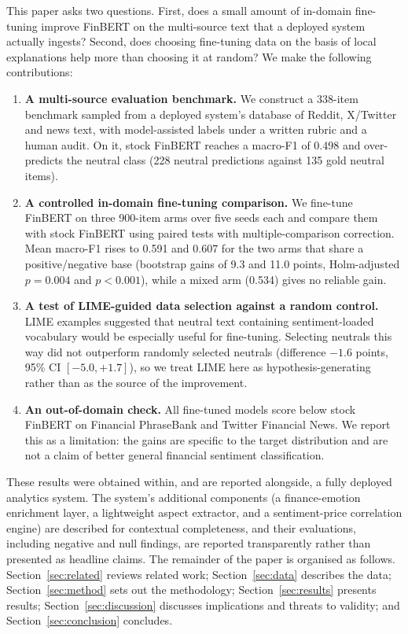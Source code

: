 \documentclass{aims}
\numberwithin{equation}{section}
\begin{document}
This paper asks two questions. First, does a small amount of in-domain fine-tuning
improve FinBERT on the multi-source text that a deployed system actually ingests?
Second, does choosing fine-tuning data on the basis of local explanations help more
than choosing it at random? We make the following contributions:
\begin{enumerate}
\item \textbf{A multi-source evaluation benchmark.} We construct a 338-item benchmark
sampled from a deployed system's database of Reddit, X/Twitter and news text, with
model-assisted labels under a written rubric and a human audit. On it, stock FinBERT
reaches a macro-F1 of 0.498 and over-predicts the neutral class (228 neutral
predictions against 135 gold neutral items).
\item \textbf{A controlled in-domain fine-tuning comparison.} We fine-tune FinBERT on
three 900-item arms over five seeds each and compare them with stock FinBERT using
paired tests with multiple-comparison correction. Mean macro-F1 rises to 0.591 and
0.607 for the two arms that share a positive/negative base (bootstrap gains of 9.3
and 11.0 points, Holm-adjusted $p = 0.004$ and $p < 0.001$), while a mixed arm
(0.534) gives no reliable gain.
\item \textbf{A test of LIME-guided data selection against a random control.}
LIME examples suggested that neutral text containing sentiment-loaded vocabulary
would be especially useful for fine-tuning. Selecting neutrals this way did not
outperform randomly selected neutrals (difference $-1.6$ points, 95\% CI
$[-5.0, +1.7]$), so we treat LIME here as hypothesis-generating rather than as the
source of the improvement.
\item \textbf{An out-of-domain check.} All fine-tuned models score below stock
FinBERT on Financial PhraseBank and Twitter Financial News. We report this as a
limitation: the gains are specific to the target distribution and are not a claim
of better general financial sentiment classification.
\end{enumerate}

These results were obtained within, and are reported alongside, a fully deployed analytics system. The system's additional components (a finance-emotion enrichment layer, a lightweight aspect extractor, and a sentiment-price correlation engine) are described for contextual completeness, and their evaluations, including negative and null findings, are reported transparently rather than presented as headline claims. The remainder of the paper is organised as follows. Section~\ref{sec:related}
reviews related work; Section~\ref{sec:data} describes the data;
Section~\ref{sec:method} sets out the methodology; Section~\ref{sec:results}
presents results; Section~\ref{sec:discussion} discusses implications and threats
to validity; and Section~\ref{sec:conclusion} concludes.
\end{document}
